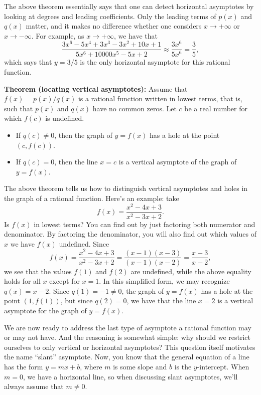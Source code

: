 \documentclass{ximera}
\begin{document}
\begin{explanation}
  The above theorem essentially says that one can detect horizontal asymptotes by looking at degrees and leading coefficients. Only the leading terms of $p(x)$ and $q(x)$ matter, and it makes no difference whether one considers $x\to +\infty$ or $x\to -\infty$. For example, as $x \to +\infty$, we have that \[  \frac{3x^6-5x^4+3x^3-3x^2 + 10x + 1}{5x^6 + 10000x^5 - 5x+2} \approx \frac{3x^6}{5x^6} = \frac{3}{5},  \]which says that $y=3/5$ is the only horizontal asymptote for this rational function.
\end{explanation}

\begin{callout}
  {\bf Theorem (locating vertical asymptotes):} Assume that $f(x) = p(x)/q(x)$ is a rational function written in lowest terms, that is, such that $p(x)$ and $q(x)$ have no common zeros. Let $c$ be a real number for which $f(c)$ is undefined.
  \begin{itemize}
  \item If $q(c) \neq 0$, then the graph of $y = f(x)$ has a hole at the point $(c,f(c))$.
  \item If $q(c) = 0$, then the line $x=c$ is a vertical asymptote of the graph of $y=f(x)$.
  \end{itemize}
\end{callout}

\begin{explanation}
  The above theorem tells us how to distinguish vertical asymptotes and holes in the graph of a rational function. Here's an example: take \[  f(x) = \frac{x^2-4x+3}{x^2-3x+2}.  \]Is $f(x)$ in lowest terms? You can find out by just factoring both numerator and denominator. By factoring the denominator, you will also find out which values of $x$ we have $f(x)$ undefined. Since \[   f(x) = \frac{x^2-4x+3}{x^2-3x+2} = \frac{(x-1)(x-3)}{(x-1)(x-2)} = \frac{x-3}{x-2},  \]we see that the values $f(1)$ and $f(2)$ are undefined, while the above equality holds for all $x$ except for $x=1$. In this simplified form, we may recognize $q(x) = x-2$. Since $q(1) = -1 \neq 0$, the graph of $y=f(x)$ has a hole at the point $(1,f(1))$, but since $q(2) = 0$, we have that the line $x=2$ is a vertical asymptote for the graph of $y=f(x)$.
\end{explanation}

We are now ready to address the last type of asymptote a rational function may or may not have. And the reasoning is somewhat simple: why should we restrict ourselves to only vertical or horizontal asymptotes? This question itself motivates the name ``slant'' asymptote. Now, you know that the general equation of a line has the form $y=mx+b$, where $m$ is some slope and $b$ is the $y$-intercept. When $m=0$, we have a horizontal line, so when discussing slant asymptotes, we'll always assume that $m \neq 0$.
\end{document}
